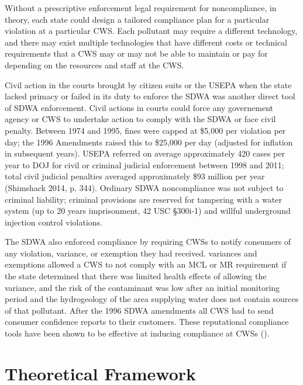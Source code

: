 \documentclass{article}
\begin{document}
Without a prescriptive enforcement legal requirement for noncompliance, in theory, each state could design a tailored compliance plan for a particular violation at a particular CWS. Each pollutant may require a different technology, and there may exist multiple technologies that have different costs or technical requirements that a CWS may or may not be able to maintain or pay for depending on the resources and staff at the CWS. 

Civil action in the courts brought by citizen suits or the USEPA when the state lacked primacy or failed in its duty to enforce the SDWA was another direct tool of SDWA enforcement. Civil actions in courts could force any governement agency or CWS to undertake action to comply with the SDWA or face civil penalty. Between 1974 and 1995, fines were capped at \$5,000 per violation per day; the 1996 Amendments raised this to \$25,000 per day (adjusted for inflation in subsequent years). USEPA referred on average approximately 420 cases per year to DOJ for civil or criminal judicial enforcement between 1998 and 2011; total civil judicial penalties averaged approximately \$93 million per year (Shimshack 2014, p. 344). Ordinary SDWA noncompliance was not subject to criminal liability; criminal provisions are reserved for tampering with a water system (up to 20 years imprisonment, 42 USC §300i-1) and willful underground injection control violations.

The SDWA also enforced compliance by requiring CWSs to notify consumers of any violation, variance, or exemption they had received. variances and exemptions allowed a CWS to not comply with an MCL or MR requirement if the state determined that there was limited health effects of allowing the variance, and the risk of the contaminant was low after an initial monitoring period and the hydrogeology of the area supplying water does not contain sources of that pollutant. After the 1996 SDWA amendments all CWS had to send consumer confidence reports to their customers. These reputational compliance tools have been shown to be effective at inducing compliance at CWSs (\cite{bennear2008impacts}).

\section{Theoretical Framework}
\end{document}
